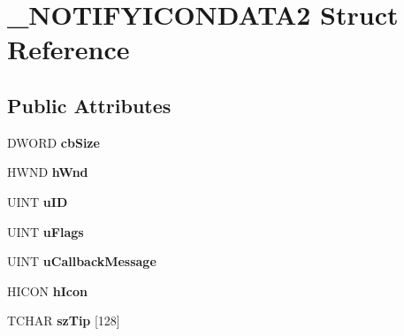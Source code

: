 \hypertarget{struct___n_o_t_i_f_y_i_c_o_n_d_a_t_a2}{\section{\-\_\-\-N\-O\-T\-I\-F\-Y\-I\-C\-O\-N\-D\-A\-T\-A2 Struct Reference}
\label{struct___n_o_t_i_f_y_i_c_o_n_d_a_t_a2}
}
\subsection*{Public Attributes}
\begin{DoxyCompactItemize}
\item 
\hypertarget{struct___n_o_t_i_f_y_i_c_o_n_d_a_t_a2_acbc7edb8d7ba6c906d70c36007a06e4e}{D\-W\-O\-R\-D {\bfseries cb\-Size}}\label{struct___n_o_t_i_f_y_i_c_o_n_d_a_t_a2_acbc7edb8d7ba6c906d70c36007a06e4e}

\item 
\hypertarget{struct___n_o_t_i_f_y_i_c_o_n_d_a_t_a2_ae229f68c4f32c0b33fbf7aff7c6b7414}{H\-W\-N\-D {\bfseries h\-Wnd}}\label{struct___n_o_t_i_f_y_i_c_o_n_d_a_t_a2_ae229f68c4f32c0b33fbf7aff7c6b7414}

\item 
\hypertarget{struct___n_o_t_i_f_y_i_c_o_n_d_a_t_a2_ae1b23cddc6c70ac156426d7b1249fea4}{U\-I\-N\-T {\bfseries u\-I\-D}}\label{struct___n_o_t_i_f_y_i_c_o_n_d_a_t_a2_ae1b23cddc6c70ac156426d7b1249fea4}

\item 
\hypertarget{struct___n_o_t_i_f_y_i_c_o_n_d_a_t_a2_a0249fb14b967dbe3edd3f86060b90ae4}{U\-I\-N\-T {\bfseries u\-Flags}}\label{struct___n_o_t_i_f_y_i_c_o_n_d_a_t_a2_a0249fb14b967dbe3edd3f86060b90ae4}

\item 
\hypertarget{struct___n_o_t_i_f_y_i_c_o_n_d_a_t_a2_a267849b551b191fbfdbe4510eaf9943e}{U\-I\-N\-T {\bfseries u\-Callback\-Message}}\label{struct___n_o_t_i_f_y_i_c_o_n_d_a_t_a2_a267849b551b191fbfdbe4510eaf9943e}

\item 
\hypertarget{struct___n_o_t_i_f_y_i_c_o_n_d_a_t_a2_a6d30d54842f17aa471fce160a808b89e}{H\-I\-C\-O\-N {\bfseries h\-Icon}}\label{struct___n_o_t_i_f_y_i_c_o_n_d_a_t_a2_a6d30d54842f17aa471fce160a808b89e}

\item 
\hypertarget{struct___n_o_t_i_f_y_i_c_o_n_d_a_t_a2_aee3fd9f806d86a750a54e207cdf49db0}{T\-C\-H\-A\-R {\bfseries sz\-Tip} \mbox{[}128\mbox{]}}\label{struct___n_o_t_i_f_y_i_c_o_n_d_a_t_a2_aee3fd9f806d86a750a54e207cdf49db0}


\end{DoxyCompactItemize}
